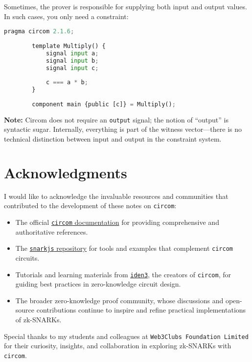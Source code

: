 \documentclass{article}
\begin{document}
	Sometimes, the prover is responsible for supplying both input and output values. In such cases, you only need a constraint:
	
	\begin{lstlisting}[language=python, caption={Constraint Without Output Signal}]
		pragma circom 2.1.6;
		
		template Multiply() {
			signal input a;
			signal input b;
			signal input c;
			
			c === a * b;
		}
		
		component main {public [c]} = Multiply();
	\end{lstlisting}
	
	\textbf{Note:} Circom does not require an \texttt{output} signal; the notion of “output” is syntactic sugar. Internally, everything is part of the witness vector—there is no technical distinction between input and output in the constraint system.
	\section*{Acknowledgments}
	
	I would like to acknowledge the invaluable resources and communities that contributed to the development of these notes on \texttt{circom}:
	
	\begin{itemize}
		\item The official \href{https://docs.circom.io}{\texttt{circom} documentation} for providing comprehensive and authoritative references.
		\item The \href{https://github.com/iden3/snarkjs}{\texttt{snarkjs} repository} for tools and examples that complement \texttt{circom} circuits.
		\item Tutorials and learning materials from \href{https://iden3.io/}{\texttt{iden3}}, the creators of \texttt{circom}, for guiding best practices in zero-knowledge circuit design.
		\item The broader zero-knowledge proof community, whose discussions and open-source contributions continue to inspire and refine practical implementations of zk-SNARKs.
	\end{itemize}
	
	Special thanks to my students and colleagues at \texttt{Web3Clubs Foundation Limited} for their curiosity, insights, and collaboration in exploring zk-SNARKs with \texttt{circom}.
	
\end{document}
